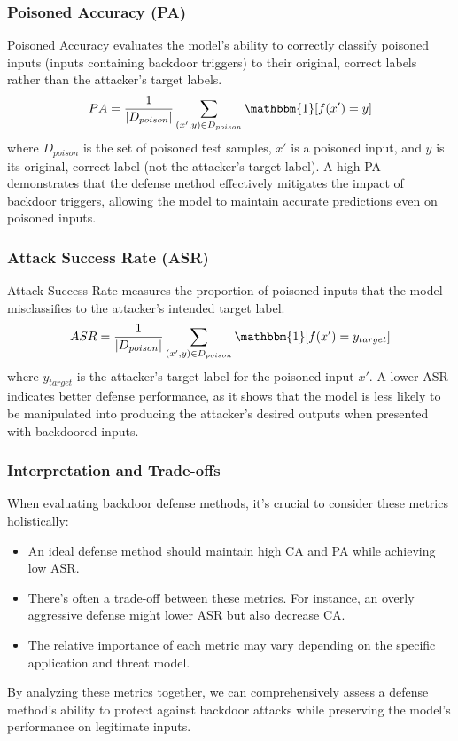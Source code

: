 \subsubsection{Poisoned Accuracy (PA)}
Poisoned Accuracy evaluates the model's ability to correctly classify poisoned inputs (inputs containing backdoor triggers) to their original, correct labels rather than the attacker's target labels.
\begin{equation}
    PA = \frac{1}{|D_{poison}|} \sum_{(x',y) \in D_{poison}} \mathbbm{1}[f(x') = y]
\end{equation}
where $D_{poison}$ is the set of poisoned test samples, $x'$ is a poisoned input, and $y$ is its original, correct label (not the attacker's target label).
A high PA demonstrates that the defense method effectively mitigates the impact of backdoor triggers, allowing the model to maintain accurate predictions even on poisoned inputs.

\subsubsection{Attack Success Rate (ASR)}
Attack Success Rate measures the proportion of poisoned inputs that the model misclassifies to the attacker's intended target label.
\begin{equation}
    ASR = \frac{1}{|D_{poison}|} \sum_{(x',y) \in D_{poison}} \mathbbm{1}[f(x') = y_{target}]
\end{equation}
where $y_{target}$ is the attacker's target label for the poisoned input $x'$.
A lower ASR indicates better defense performance, as it shows that the model is less likely to be manipulated into producing the attacker's desired outputs when presented with backdoored inputs.

\subsubsection{Interpretation and Trade-offs}
When evaluating backdoor defense methods, it's crucial to consider these metrics holistically:
\begin{itemize}[leftmargin=*]
    \item An ideal defense method should maintain high CA and PA while achieving low ASR.
    \item There's often a trade-off between these metrics. For instance, an overly aggressive defense might lower ASR but also decrease CA.
    \item The relative importance of each metric may vary depending on the specific application and threat model.
\end{itemize}
By analyzing these metrics together, we can comprehensively assess a defense method's ability to protect against backdoor attacks while preserving the model's performance on legitimate inputs.

